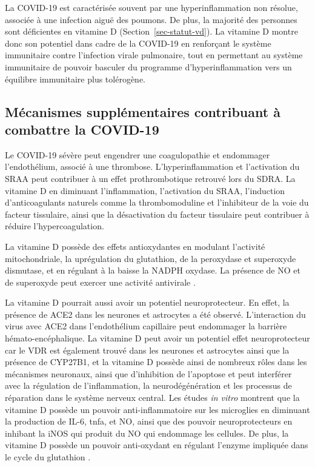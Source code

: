 \documentclass[
  a4paper,
  DIV=11,
  numbers=noendperiod,
  listof=totoc]{scrreprt}
\begin{document}
La \ac{COVID-19} est caractérisée souvent par une hyperinflammation non
résolue, associée à une infection aiguë des poumons. De plus, la
majorité des personnes sont déficientes en vitamine D
(Section~\ref{sec-statut-vd}). La vitamine D montre donc son potentiel
dans cadre de la \ac{COVID-19} en renforçant le système immunitaire
contre l'infection virale pulmonaire, tout en permettant au système
immunitaire de pouvoir basculer du programme d'hyperinflammation vers un
équilibre immunitaire plus tolérogène.

\subsection{Mécanismes supplémentaires contribuant à combattre la
COVID-19}\label{muxe9canismes-suppluxe9mentaires-contribuant-uxe0-combattre-la-covid-19}

Le COVID-19 sévère peut engendrer une coagulopathie et endommager
l'endothélium, associé à une thrombose. L'hyperinflammation et
l'activation du \ac{SRAA} peut contribuer à un effet prothrombotique
retrouvé lors du \ac{SDRA}. La vitamine D en diminuant l'inflammation,
l'activation du \ac{SRAA}, l'induction d'anticoagulants naturels comme
la thrombomoduline et l'inhibiteur de la voie du facteur tissulaire,
ainsi que la désactivation du facteur tissulaire peut contribuer à
réduire l'hypercoagulation.

La vitamine D possède des effets antioxydantes en modulant l'activité
mitochondriale, la uprégulation du glutathion, de la peroxydase et
superoxyde dismutase, et en régulant à la baisse la NADPH oxydase. La
présence de \ac{NO} et de superoxyde peut exercer une activité
antivirale \autocite{Shiravi.2022,Contreras-Bolívar.2023}.

La vitamine D pourrait aussi avoir un potentiel neuroprotecteur. En
effet, la présence de \ac{ACE2} dans les neurones et astrocytes a été
observé. L'interaction du virus avec \ac{ACE2} dans l'endothélium
capillaire peut endommager la barrière hémato-encéphalique. La vitamine
D peut avoir un potentiel effet neuroprotecteur car le \ac{VDR} est
également trouvé dans les neurones et astrocytes ainsi que la présence
de \ac{CYP27B1}, et la vitamine D possède ainsi de nombreux rôles dans
les mécanismes neuronaux, ainsi que d'inhibition de l'apoptose et peut
interférer avec la régulation de l'inflammation, la neurodégénération et
les processus de réparation dans le système nerveux central. Les études
\emph{in vitro} montrent que la vitamine D possède un pouvoir
anti-inflammatoire sur les microglies en diminuant la production de
IL-6, \ac{tnfa}, et NO, ainsi que des pouvoir neuroprotecteurs en
inhibant la iNOS qui produit du NO qui endommage les cellules. De plus,
la vitamine D possède un pouvoir anti-oxydant en régulant l'enzyme
impliquée dans le cycle du glutathion \autocite{Shiravi.2022}.
\end{document}
